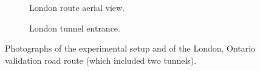 \documentclass[letterpaper, 10pt, journal, twoside]{IEEEtran}
\begin{document}
\begin{figure}
\begin{subfigure}[]{0.45\columnwidth}
		\caption{London route aerial view.}
		\label{fig:experiment:sub3}
	\end{subfigure}
	\begin{subfigure}[]{0.45\columnwidth}
		\caption{London tunnel entrance.}
		\label{fig:experiment:sub4}
	\end{subfigure} 
	\caption{Photographs of the experimental setup and of the London, Ontario validation road route (which included two tunnels).}
	\label{fig:experiment}
	\vspace{-4mm}
\end{figure}
\end{document}
